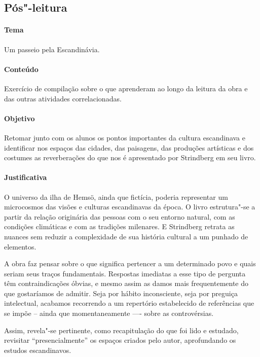 \documentclass[12pt]{extarticle}
\begin{document}

\subsection{Pós"-leitura}

\paragraph{Tema} Um passeio pela Escandinávia. 

\paragraph{Conteúdo} Exercício de compilação sobre o que aprenderam 
ao longo da leitura da obra e das outras 
atividades correlacionadas. 

\paragraph{Objetivo} Retomar junto com os alunos os pontos importantes da 
cultura escandinava e identificar 
nos espaços das cidades, das paisagens, das produções artísticas e dos 
costumes as reverberações do que nos 
é apresentado por Strindberg em seu livro. 

\paragraph{Justificativa} O universo da ilha de Hemsö, ainda 
que fictícia, poderia representar um microcosmos 
das visões e culturas escandinavas da época. O livro estrutura"-se a 
partir da relação originária das pessoas 
com o seu entorno natural, com as condições climáticas e com as 
tradições milenares. E Strindberg retrata 
as nuances sem reduzir a complexidade de sua história cultural 
a um punhado de elementos.

A obra faz pensar sobre o que significa pertencer a um determinado povo e 
quais seriam seus traços fundamentais. 
Respostas imediatas a esse tipo de pergunta têm contraindicações óbvias, 
e mesmo assim as damos mais frequentemente 
do que gostaríamos de admitir. Seja por hábito inconsciente, seja por 
preguiça intelectual, acabamos recorrendo a um 
repertório estabelecido de referências que se impõe -- ainda que 
momentaneamente —- sobre as controvérsias.

Assim, revela"-se pertinente, como recapitulação do que foi lido e 
estudado, revisitar ``presencialmente'' os espaços 
criados pelo autor, aprofundando os estudos escandinavos. 
\end{document}

